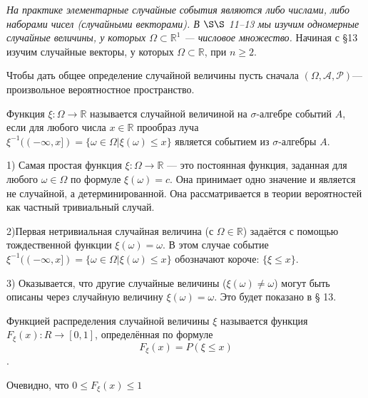 \textit{На практике элементарные случайные события являются либо числами, либо наборами чисел (случайными векторами). В $\S\S$ 11–13 мы изучим
одномерные случайные величины, у которых $\Omega\subset\mathbb{R}^1$ — числовое множество.} Начиная с §13 изучим случайные векторы, у которых  
$\Omega\subset\mathbb{R}$, при $n \geqslant 2$.

Чтобы дать общее определение случайной величины пусть сначала $(\Omega, \mathcal{A}, \mathcal{P})$— произвольное вероятностное пространство.

\begin{definition}
	Функция $\xi : \Omega \rightarrow \mathbb{R}$ называется случайной величиной на $\sigma$-алгебре событий $A$, если для любого числа $x\in\mathbb{R}$ прообраз луча
	$\xi^{-1}((-\infty,x])=\{\omega\in\Omega|\xi(\omega)\leqslant x\}$
	 является событием из $\sigma$-алгебры $A$.
\end{definition}

\begin{remark}
	
1) Самая простая функция $\xi : \Omega \rightarrow \mathbb{R}$ — это постоянная функция, заданная для любого $\omega \in \Omega$ по формуле $\xi(\omega)=c$. Она
принимает одно значение и является не случайной, а детерминированной.
Она рассматривается в теории вероятностей как частный тривиальный
случай.

2)Первая нетривиальная случайная величина (с $\Omega \in \mathbb{R}$) задаётся
с помощью тождественной функции $\xi(\omega) = \omega$. В этом случае событие
$\xi^{-1}((-\infty,x])=\{\omega\in\Omega|\xi(\omega)\leqslant x\}$ обозначают короче: $\{\xi \leqslant x\}$.

3) Оказывается, что другие случайные величины ($\xi(\omega) \neq \omega$) могут быть
описаны через случайную величину $\xi(\omega) = \omega$. Это будет показано в § 13.
\end{remark}

\begin{definition}
\label{def:11.3}
	Функцией распределения случайной величины $\xi$ называется функция $F_{\xi}(x) : R \rightarrow [0, 1]$, определённая по формуле
$$F_{\xi}(x)=P(\xi\leqslant x)$$.
\end{definition}

Очевидно, что $0\leqslant F_{\xi}(x)\leqslant 1$

